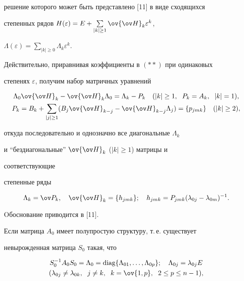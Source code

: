 решение которого может быть представлено [11] в виде сходящихся 


степенных рядов $H(\varepsilon)=E+\sum\limits_{|k|\ge1} 


\ov{\ov H}_k\varepsilon^k$, 


$\Lambda(\varepsilon)=\sum\limits_{|k|\ge0}\Lambda_k\varepsilon^k$. 


Действительно, приравнивая коэффициенты в $(**)$ при одинаковых 


степенях $\varepsilon$, получим набор матричных уравнений 


\begin{gather*} 


\Lambda_0\ov{\ov H}_k-\ov{\ov H}_k\Lambda_0= 


\Lambda_k-P_k\quad(|k|\ge1,\ \; P_k=A_k,\ \; |k|=1),\\ 


P_k=B_k+\sum_{|j|\ge1}(B_j\ov{\ov H}_{k-j}- 


\ov{\ov H}_{k-j}\Lambda_j)=\{p_{jmk}\} 


\quad (|k|\ge2), 


\end{gather*} 


откуда последовательно и однозначно все диагональные $\Lambda_k$ 


и ``бездиагональные'' $\ov{\ov H}_k$ ($|k|\ge1$) матрицы и 


соответствующие 


степенные ряды 


$$ 


\Lambda_k=\ov P_k,\quad 


\ov{\ov H}_k=\{h_{jmk}\};\quad 


h_{jmk}=P_{jmk}(\lambda_{0j}-\lambda_{0m})^{-1}. 


$$ 


Oбоснование приводится в [11]. 


 


Если матрица $A_0$ имеет полупростую структуру, т.\,е. существует 


невырожденная матрица $S_0$ такая, что 


\begin{gather*} 


S^{-1}_0A_0S_0=\Lambda_0=\diag\{\Lambda_{01},\dotsc, 


\Lambda_{0p}\};\quad \Lambda_{0j}=\lambda_{0j}E\\ 


%


(\lambda_{0j}\ne\lambda_{0k},\ \; j\ne k, 


\ \; k=\ov{1,p},\ \; 2\le p\le n-1), 


\end{gather*} 


